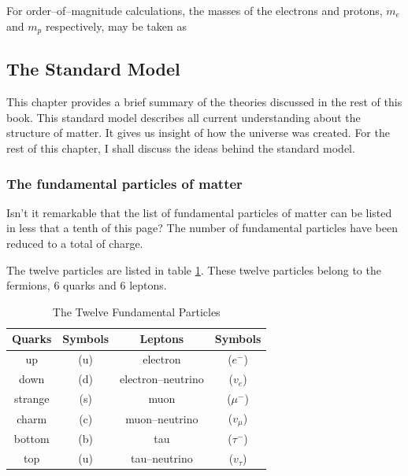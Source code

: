 For order--of--magnitude calculations, the masses of the electrons and protons, $m_e$ and $m_p$ respectively, may be taken as


\subsection{The Standard Model}\label{StandardModel::sec}
This chapter provides a brief summary of the theories discussed in the rest of this book. This standard model describes all current understanding about the structure of matter. It gives us insight of how the universe was created. For the rest of this chapter, I shall discuss the ideas behind the standard model.

\subsubsection{The fundamental particles of matter}
Isn't it remarkable that the list of fundamental particles of matter can be listed in less that a tenth of this page? The number of fundamental particles have been reduced to a total of charge. 

The twelve particles are listed in table \ref{twelveparticles::table}. These twelve particles belong to the fermions, 6 quarks and 6 leptons.

\begin{table}[http]

\begin{center}
\begin{tabular}{|c c|c c |}
\hline
Quarks & Symbols & Leptons & Symbols \\ \hline
up & (u) & electron & ($e^-$) \\
down & (d) & electron--neutrino & ($v_e$) \\
strange & (s) & muon & ($\mu^-$) \\
charm & (c) & muon--neutrino & ($v_\mu$)\\
bottom  & (b) & tau & ($\tau^-$) \\
top & (u) & tau--neutrino & ($v_\tau$) \\ \hline

\end{tabular}
\end{center}
\caption{The Twelve Fundamental Particles}
\label{twelveparticles::table}
\end{table}

